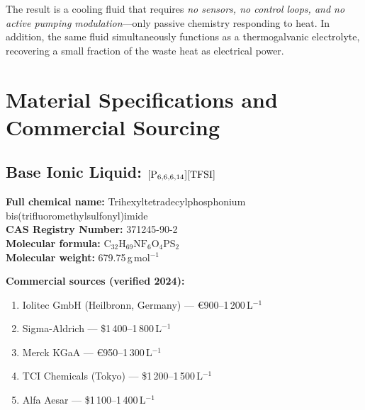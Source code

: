 \documentclass[11pt,a4paper]{article}
\begin{document}
The result is a cooling fluid that requires \textit{no sensors, no control loops, and no active pumping modulation}---only passive chemistry responding to heat. In addition, the same fluid simultaneously functions as a thermogalvanic electrolyte, recovering a small fraction of the waste heat as electrical power.

\section{Material Specifications and Commercial Sourcing}

\subsection{Base Ionic Liquid: $[\ce{P_{6,6,6,14}}][\ce{TFSI}]$}
\textbf{Full chemical name:} Trihexyltetradecylphosphonium bis(trifluoromethylsulfonyl)imide\\
\textbf{CAS Registry Number:} 371245-90-2\\
\textbf{Molecular formula:} $\mathrm{C_{32}H_{69}NF_6O_4PS_2}$\\
\textbf{Molecular weight:} 679.75\,g\,mol$^{-1}$

\textbf{Commercial sources (verified 2024):}
\begin{enumerate}[leftmargin=1.5em]
    \item Iolitec GmbH (Heilbronn, Germany) --- €900--1\,200\,L$^{-1}$
    \item Sigma-Aldrich --- \$1\,400--1\,800\,L$^{-1}$
    \item Merck KGaA --- €950--1\,300\,L$^{-1}$
    \item TCI Chemicals (Tokyo) --- \$1\,200--1\,500\,L$^{-1}$
    \item Alfa Aesar --- \$1\,100--1\,400\,L$^{-1}$
\end{enumerate}
\end{document}
